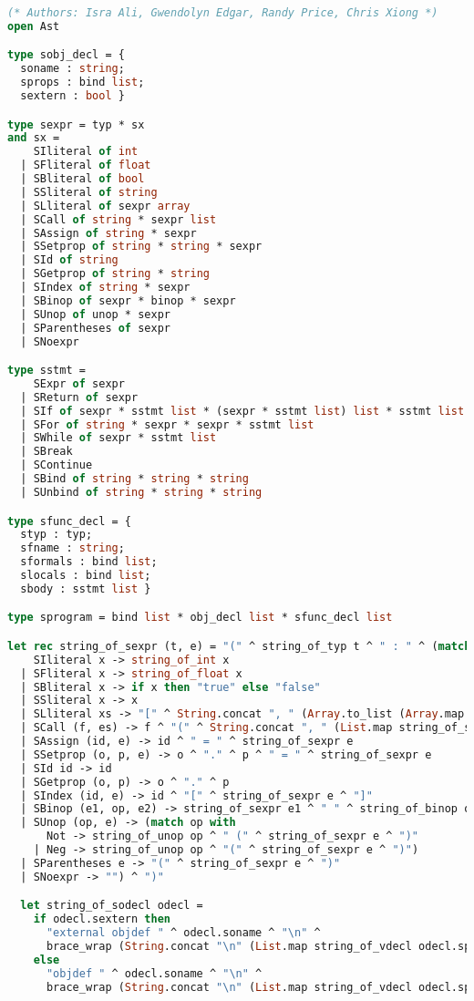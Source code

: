 \begin{lstlisting}[language=Caml,backgroundcolor=\color{backgroundcolor}]
(* Authors: Isra Ali, Gwendolyn Edgar, Randy Price, Chris Xiong *)
open Ast

type sobj_decl = {
  soname : string;
  sprops : bind list;
  sextern : bool }

type sexpr = typ * sx
and sx =
    SIliteral of int
  | SFliteral of float
  | SBliteral of bool
  | SSliteral of string
  | SLliteral of sexpr array
  | SCall of string * sexpr list
  | SAssign of string * sexpr
  | SSetprop of string * string * sexpr
  | SId of string
  | SGetprop of string * string
  | SIndex of string * sexpr
  | SBinop of sexpr * binop * sexpr
  | SUnop of unop * sexpr
  | SParentheses of sexpr
  | SNoexpr

type sstmt =
    SExpr of sexpr
  | SReturn of sexpr
  | SIf of sexpr * sstmt list * (sexpr * sstmt list) list * sstmt list
  | SFor of string * sexpr * sexpr * sstmt list
  | SWhile of sexpr * sstmt list
  | SBreak
  | SContinue
  | SBind of string * string * string
  | SUnbind of string * string * string

type sfunc_decl = {
  styp : typ;
  sfname : string;
  sformals : bind list;
  slocals : bind list;
  sbody : sstmt list }

type sprogram = bind list * obj_decl list * sfunc_decl list

let rec string_of_sexpr (t, e) = "(" ^ string_of_typ t ^ " : " ^ (match e with 
    SIliteral x -> string_of_int x
  | SFliteral x -> string_of_float x
  | SBliteral x -> if x then "true" else "false"
  | SSliteral x -> x
  | SLliteral xs -> "[" ^ String.concat ", " (Array.to_list (Array.map string_of_sexpr xs)) ^ "]"
  | SCall (f, es) -> f ^ "(" ^ String.concat ", " (List.map string_of_sexpr es) ^ ")"
  | SAssign (id, e) -> id ^ " = " ^ string_of_sexpr e
  | SSetprop (o, p, e) -> o ^ "." ^ p ^ " = " ^ string_of_sexpr e
  | SId id -> id
  | SGetprop (o, p) -> o ^ "." ^ p
  | SIndex (id, e) -> id ^ "[" ^ string_of_sexpr e ^ "]"
  | SBinop (e1, op, e2) -> string_of_sexpr e1 ^ " " ^ string_of_binop op ^ " " ^ string_of_sexpr e2
  | SUnop (op, e) -> (match op with
      Not -> string_of_unop op ^ " (" ^ string_of_sexpr e ^ ")"
    | Neg -> string_of_unop op ^ "(" ^ string_of_sexpr e ^ ")")
  | SParentheses e -> "(" ^ string_of_sexpr e ^ ")"
  | SNoexpr -> "") ^ ")"

  let string_of_sodecl odecl =
    if odecl.sextern then
      "external objdef " ^ odecl.soname ^ "\n" ^
      brace_wrap (String.concat "\n" (List.map string_of_vdecl odecl.sprops))
    else
      "objdef " ^ odecl.soname ^ "\n" ^
      brace_wrap (String.concat "\n" (List.map string_of_vdecl odecl.sprops))


\end{lstlisting}

